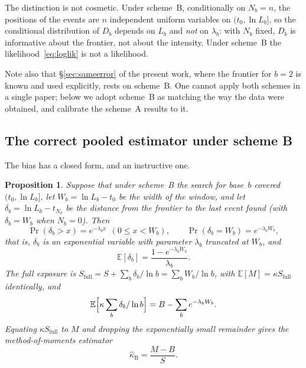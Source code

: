 \documentclass[11pt,a4paper]{article}
\theoremstyle{plain}
\newtheorem{proposition}{Proposition}
\theoremstyle{remark}
\begin{document}
The distinction is not cosmetic. Under scheme~B, conditionally on $N_b=n$, the
positions of the events are $n$ independent uniform variables on
$(t_0,\ln L_b]$, so the conditional distribution of $D_b$ depends on $L_b$ and
\emph{not} on $\lambda_b$: with $N_b$ fixed, $D_b$ is informative about the
frontier, not about the intensity. Under scheme~B the
likelihood~\eqref{eq:loglik} is not a likelihood.

Note also that \S\ref{sec:sameerror} of the present work, where the frontier for
$b=2$ is known and used explicitly, rests on scheme~B. One cannot apply both
schemes in a single paper; below we adopt scheme~B as matching the way the data
were obtained, and calibrate the scheme~A results to it.

\subsection{The correct pooled estimator under scheme B}

The bias has a closed form, and an instructive one.

\begin{proposition}\label{prop:schemeB}
Suppose that under scheme~B the search for base~$b$ covered $(t_0,\ln L_b]$, let
$W_b=\ln L_b-t_0$ be the width of the window, and let
$\delta_b=\ln L_b-t_{N_b}$ be the distance from the frontier to the last event
found (with $\delta_b=W_b$ when $N_b=0$). Then
\begin{equation}\label{eq:delta}
\Pr(\delta_b>x)=e^{-\lambda_b x}\ \ (0\le x<W_b),\qquad
\Pr(\delta_b=W_b)=e^{-\lambda_b W_b},
\end{equation}
that is, $\delta_b$ is an exponential variable with parameter $\lambda_b$
truncated at $W_b$, and
\begin{equation}\label{eq:Edelta}
\mathbb E[\delta_b]=\frac{1-e^{-\lambda_b W_b}}{\lambda_b}.
\end{equation}
The full exposure is
$S_{\mathrm{full}}=S+\sum_b\delta_b/\ln b=\sum_b W_b/\ln b$, with
$\mathbb E[M]=\kappa S_{\mathrm{full}}$ identically, and
\begin{equation}\label{eq:EBd}
\mathbb E\Bigl[\kappa\sum_b\delta_b/\ln b\Bigr]=B-\sum_b e^{-\lambda_b W_b}.
\end{equation}
Equating $\kappa S_{\mathrm{full}}$ to $M$ and dropping the exponentially small
remainder gives the method-of-moments estimator
\begin{equation}\label{eq:MBS}
\hat\kappa_{\mathrm B}=\frac{M-B}{S}.
\end{equation}
\end{proposition}
\end{document}
